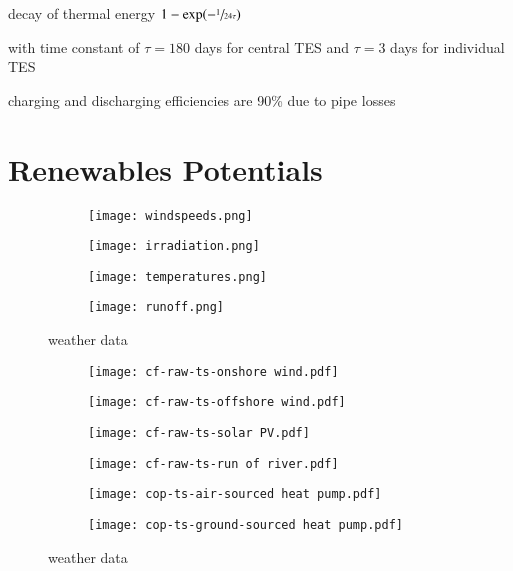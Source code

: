 decay of thermal energy $1-\exp(-\sfrac{1}{24\tau})$

with time constant of $\tau=180$ days for central TES and $\tau=3$ days for individual TES

charging and discharging efficiencies are 90\% due to pipe losses

\section{Renewables Potentials}

\begin{figure}
    \centering
        \begin{subfigure}[t]{0.49\textwidth}
            \centering
        \texttt{[image: windspeeds.png]}
    \end{subfigure}
    \begin{subfigure}[t]{0.49\textwidth}
        \centering
        \texttt{[image: irradiation.png]}
    \end{subfigure}
    \begin{subfigure}[t]{0.49\textwidth}
        \centering
        \texttt{[image: temperatures.png]}
    \end{subfigure}
    \begin{subfigure}[t]{0.49\textwidth}
        \centering
        \texttt{[image: runoff.png]}
    \end{subfigure}
    \caption{weather data}
    \label{fig:weather-data}
\end{figure}

\begin{figure}
    \centering
        \begin{subfigure}[t]{0.49\textwidth}
            \centering
        \texttt{[image: cf-raw-ts-onshore wind.pdf]}
    \end{subfigure}
    \begin{subfigure}[t]{0.49\textwidth}
        \centering
        \texttt{[image: cf-raw-ts-offshore wind.pdf]}
    \end{subfigure}
    \begin{subfigure}[t]{0.49\textwidth}
        \centering
        \texttt{[image: cf-raw-ts-solar PV.pdf]}
    \end{subfigure}
    \begin{subfigure}[t]{0.49\textwidth}
        \centering
        \texttt{[image: cf-raw-ts-run of river.pdf]}
    \end{subfigure}
    \begin{subfigure}[t]{0.49\textwidth}
        \centering
        \texttt{[image: cop-ts-air-sourced heat pump.pdf]}
    \end{subfigure}
    \begin{subfigure}[t]{0.49\textwidth}
        \centering
        \texttt{[image: cop-ts-ground-sourced heat pump.pdf]}
    \end{subfigure}
    \caption{weather data}
    \label{fig:weather-data}
\end{figure}

